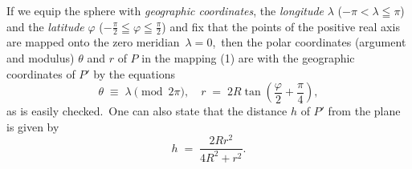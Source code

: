 \documentclass[12pt]{article}
\begin{document}
If we equip the sphere with {\em geographic coordinates}, the {\em longitude} $\lambda$ ($-\pi < \lambda \leqq \pi$) and the {\em latitude} $\varphi$ ($-\frac{\pi}{2} \leqq \varphi \leqq \frac{\pi}{2}$) and fix that the points of the positive real axis are mapped onto the zero meridian\, $\lambda = 0$,\, then the polar coordinates (argument and modulus) $\theta$ and $r$ of $P$ in the mapping (1) are  with the geographic coordinates of $P'$ by the equations
   $$\theta \;\equiv\; \lambda \!\pmod{2\pi}, \quad r \;=\; 2R\tan\left(\frac{\varphi}{2}+\frac{\pi}{4}\right),$$
as is easily checked.\, One can also state that the distance $h$ of $P'$ from the plane is given by
              $$h \;=\; \frac{2Rr^2}{4R^2\!+\!r^2}.$$

\end{document}
